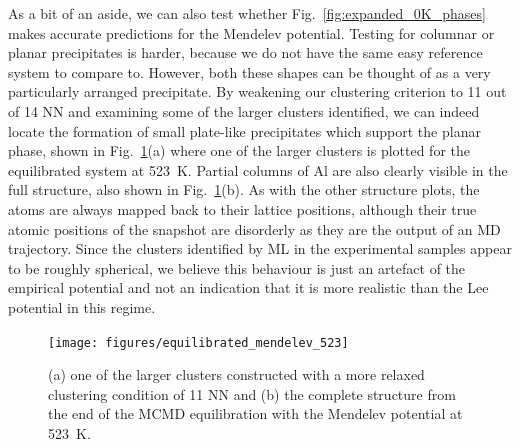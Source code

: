 As a bit of an aside, we can also test whether Fig.~\ref{fig:expanded_0K_phases} makes accurate predictions for the Mendelev potential.
Testing for columnar or planar precipitates is harder, because we do not have the same easy reference system to compare to.
However, both these shapes can be thought of as a very particularly arranged \BTWO precipitate.
By weakening our clustering criterion to 11 out of 14 NN and examining some of the larger \BTWO clusters identified, we can indeed locate the formation of small plate-like precipitates which support the planar phase, shown in Fig.~\ref{fig:mendelev_structure}(a) where one of the larger clusters is plotted for the equilibrated system at 523~K.
Partial columns of Al are also clearly visible in the full structure, also shown in Fig.~\ref{fig:mendelev_structure}(b).
As with the other structure plots, the atoms are always mapped back to their lattice positions, although their true atomic positions of the snapshot are disorderly as they are the output of an MD trajectory.
Since the clusters identified by ML in the experimental samples appear to be roughly spherical, we believe this behaviour is just an artefact of the empirical potential and not an indication that it is more realistic than the Lee potential in this regime.
%
\begin{figure}[h]
    \centering
    \texttt{[image: figures/equilibrated\_mendelev\_523]}
    \caption{(a) one of the larger \BTWO clusters constructed with a more relaxed clustering condition of 11 NN and (b) the complete structure from the end of the MCMD equilibration with the Mendelev potential at 523~K.}
    \label{fig:mendelev_structure}
\end{figure}
